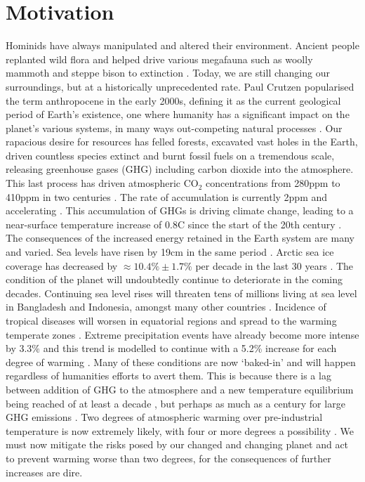 \section{Motivation}
Hominids have always manipulated and altered their environment. Ancient people replanted wild flora and helped drive various megafauna such as woolly mammoth and steppe bison to extinction \cite{Mann2015} \cite{Pushkina2008}. Today, we are still changing our surroundings, but at a historically unprecedented rate. Paul Crutzen popularised the term anthropocene in the early 2000s, defining it as the current geological period of Earth's existence, one where humanity has a significant impact on the planet's various systems, in many ways out-competing natural processes \cite{Crutzen2006}. Our rapacious desire for resources has felled forests, excavated vast holes in the Earth, driven countless species extinct and burnt fossil fuels on a tremendous scale, releasing greenhouse gases (GHG)  including carbon dioxide into the atmosphere. This last process has driven atmospheric CO$_{2}$ concentrations from 280ppm  to 410ppm in two centuries \cite{NOAA2018}. The rate of accumulation is currently 2ppm and accelerating \cite{NOAA2018}. This accumulation of GHGs is driving climate change, leading to a near-surface temperature increase of 0.8\textdegree C since the start of the 20th century \cite{Hansen2010}. The consequences of the increased energy retained in the Earth system are many and varied. Sea levels have risen by 19cm in the same period \cite{Church2013}. Arctic sea ice coverage has decreased by $\approx 10.4\% \pm 1.7\%$ per decade in the last 30 years \cite{NSIDC2018}. The condition of the planet will undoubtedly continue to deteriorate in the coming decades. Continuing sea level rises will threaten tens of millions living at sea level in Bangladesh and Indonesia, amongst many other countries \cite{EJF2017}. Incidence of tropical diseases will worsen in equatorial regions and spread to the warming temperate zones \cite{Shuman2010}. Extreme precipitation events have already become more intense by 3.3\% and this trend is modelled to continue with a 5.2\% increase for each degree of warming \cite{Zhang2013}. Many of these conditions are now `baked-in' and will happen regardless of humanities efforts to avert them. This is because there is a lag between addition of GHG to the atmosphere and a new temperature equilibrium being reached of at least a decade \cite{Ricke2014}, but perhaps as much as a century for large GHG emissions \cite{Zickfeld2015}. Two degrees of atmospheric warming over pre-industrial temperature is now extremely likely, with four or more degrees a possibility \cite{IPCC2007}. We must now mitigate the risks posed by our changed and changing planet and act to prevent warming worse than two degrees, for the consequences of further increases are dire.

